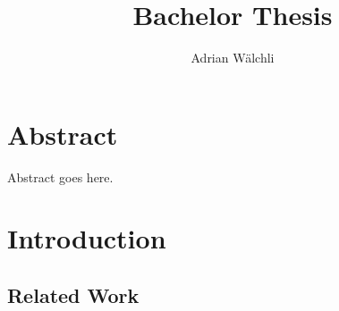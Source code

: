 \documentclass[10pt,a4paper,onecolumn]{book}
\author{Adrian Wälchli}
\title{Bachelor Thesis}
\begin{document}


\chapter*{Abstract}
	Abstract goes here.


\tableofcontents

\chapter{Introduction}
\section{Related Work}




\end{document}
